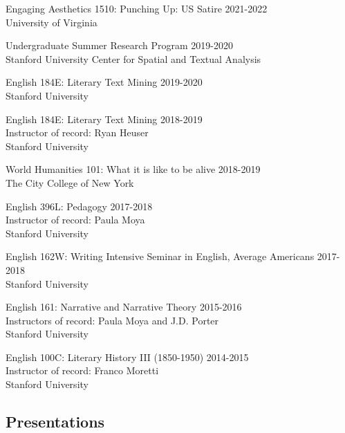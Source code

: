 \documentclass[
  12pt,
  letterpaper,
]{article}
\begin{document}
Engaging Aesthetics 1510: Punching Up: US Satire \hfill 2021-2022\\
\hspace*{0.333em} University of Virginia

Undergraduate Summer Research Program \hfill 2019-2020\\
\hspace*{0.333em} Stanford University Center for Spatial and Textual
Analysis

English 184E: Literary Text Mining \hfill 2019-2020\\
\hspace*{0.333em} Stanford University

English 184E: Literary Text Mining \hfill 2018-2019\\
\hspace*{0.333em} Instructor of record: Ryan Heuser\\
\hspace*{0.333em} Stanford University

World Humanities 101: What it is like to be alive \hfill 2018-2019\\
\hspace*{0.333em} The City College of New York

English 396L: Pedagogy \hfill 2017-2018\\
\hspace*{0.333em} Instructor of record: Paula Moya\\
\hspace*{0.333em} Stanford University

English 162W: Writing Intensive Seminar in English, Average Americans
\hfill 2017-2018\\
\hspace*{0.333em} Stanford University

English 161: Narrative and Narrative Theory \hfill 2015-2016\\
\hspace*{0.333em} Instructors of record: Paula Moya and J.D. Porter\\
\hspace*{0.333em} Stanford University

English 100C: Literary History III (1850-1950) \hfill 2014-2015\\
\hspace*{0.333em} Instructor of record: Franco Moretti\\
\hspace*{0.333em} Stanford University

\hypertarget{presentations}{%
\subsection{Presentations}\label{presentations}}
\end{document}
